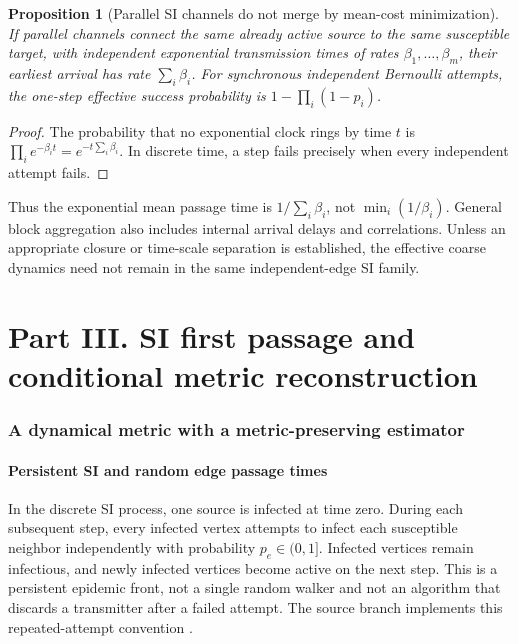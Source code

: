 \documentclass[11pt,letterpaper]{article}
\newtheorem{proposition}[theorem]{Proposition}
\theoremstyle{definition}
\theoremstyle{remark}
\begin{document}
\begin{proposition}[Parallel SI channels do not merge by mean-cost minimization]\label{prop:parallel}
If parallel channels connect the same already active source to the same susceptible target, with independent exponential transmission times of rates $\beta_1,\ldots,\beta_m$, their earliest arrival has rate $\sum_i\beta_i$. For synchronous independent Bernoulli attempts, the one-step effective success probability is $1-\prod_i(1-p_i)$.
\end{proposition}
\begin{proof}
The probability that no exponential clock rings by time $t$ is $\prod_i e^{-\beta_i t}=e^{-t\sum_i\beta_i}$. In discrete time, a step fails precisely when every independent attempt fails.
\end{proof}

Thus the exponential mean passage time is $1/\sum_i\beta_i$, not $\min_i(1/\beta_i)$. General block aggregation also includes internal arrival delays and correlations. Unless an appropriate closure or time-scale separation is established, the effective coarse dynamics need not remain in the same independent-edge SI family.

\part*{Part III. SI first passage and conditional metric reconstruction}

\section{A dynamical metric with a metric-preserving estimator}\label{sec:si}
\subsection{Persistent SI and random edge passage times}
In the discrete SI process, one source is infected at time zero. During each subsequent step, every infected vertex attempts to infect each susceptible neighbor independently with probability $p_e\in(0,1]$. Infected vertices remain infectious, and newly infected vertices become active on the next step. This is a persistent epidemic front, not a single random walker and not an algorithm that discards a transmitter after a failed attempt. The source branch implements this repeated-attempt convention \cite{leblondSI}.
\end{document}
